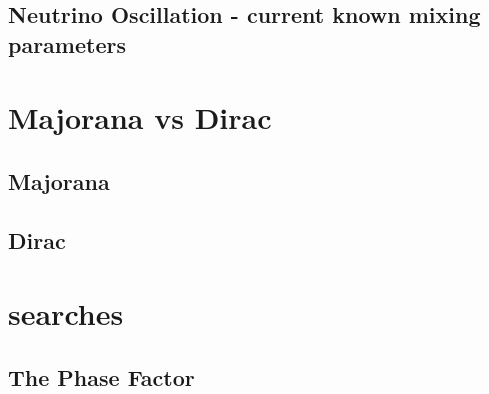 \subsection{Neutrino Oscillation - current known mixing parameters}
\begin{comment}
Talk about current constraints on parameters
Talk about experiments that constrain these parameters?  This seems far afield, maybe.
\end{comment}


\section{Majorana vs Dirac}
\label{sec:mVd}
\begin{comment}
Discuss mechanisms by which neutrinos could get their mass.  
\end{comment}


\subsection{Majorana}
\begin{comment}
Discuss Majorana mechanism for mass
\end{comment}


\subsection{Dirac}
\begin{comment}
Discuss Dirac mechanism for mass
\end{comment}


\section{\zvbb searches}
\begin{comment}
Discuss \zvbb process and sensitivity to nature of neutrino.
Discuss concurrent sensitivity to hadron part
I feel like I should discuss ongoing searches but not in much detail?  Relevant information is: expected lifetime, mass, expected counts/year, expected limits?
Okay, yes.  Here is how this section could go: discuss the process and the resulting equation for the lifetime, and then talk about each of the components of the equation.  START with the discussion of the lifetime - can include details of ongoing experiments there.
\end{comment}


\subsection{The Phase Factor}
\begin{comment}
Explain the phase factor, calculate it
\end{comment}


